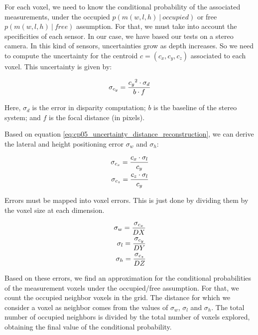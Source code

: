 For each voxel, we need to know the conditional probability of the associated measurements, under the occupied $p(m(w,l,h)~|~occupied)$ or free $p(m(w,l,h)~|~free)$ assumption. For that, we must take into account the specificities of each sensor. In our case, we have based our tests on a stereo camera. In this kind of sensors, uncertainties grow as depth increases. So we need to compute the uncertainty for the centroid $c=(c_x, c_y, c_z)$ associated to each voxel. This uncertainty is given by:

\begin{equation}\label{eq:cp05_uncertainty_distance_reconstruction}
\sigma_{c_y}={{{c_y}^2 \cdot \sigma_d} \over {b \cdot f}}
\end{equation}

Here, $\sigma_d$ is the error in disparity computation; $b$ is the baseline of the stereo system; and $f$ is the focal distance (in pixels).

Based on equation \ref{eq:cp05_uncertainty_distance_reconstruction}, we can derive the lateral and height positioning error $\sigma_w$ and $\sigma_h$:

\begin{equation}\label{eq:cp05_uncertainty_lateral_and_height_reconstruction}
\begin{align}
\sigma_{c_x}={{{c_x} \cdot \sigma_l} \over {c_y}} \\
\sigma_{c_z}={{{c_z} \cdot \sigma_l} \over {c_y}}
\end{align}
\end{equation}

Errors must be mapped into voxel errors. This is just done by dividing them by the voxel size at each dimension.

\begin{equation}\label{eq:cp05_uncertainty_voxel_errors}
\begin{align}
\sigma_w={{\sigma_{c_x}} \over {DX}} \\
\sigma_l={{\sigma_{c_y}} \over {DY}} \\
\sigma_h={{\sigma_{c_z}} \over {DZ}}
\end{align}
\end{equation}

Based on these errors, we find an approximation for the conditional probabilities of the measurement voxels under the occupied/free assumption. For that, we count the occupied neighbor voxels in the grid. The distance for which we consider a voxel as neighbor comes from the values of $\sigma_w$, $\sigma_l$ and $\sigma_h$. The total number of occupied neighbors is divided by the total number of voxels explored, obtaining the final value of the conditional probability.

